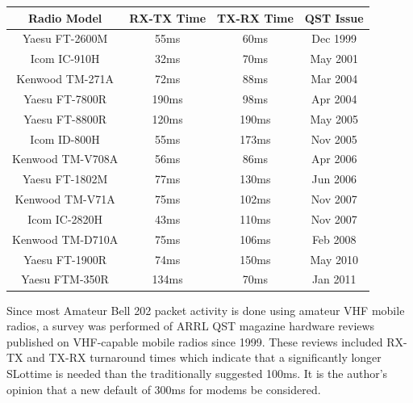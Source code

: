 \documentclass[12pt,letterpaper]{article}
\begin{document}
\begin{center}
\begin{tabular}{ | c || c | c || c |}
	\hline
	Radio Model & RX-TX Time & TX-RX Time & QST Issue \\ \hline
	Yaesu FT-2600M & 55ms & 60ms & Dec 1999 \\ \hline
	Icom IC-910H & 32ms & 70ms & May 2001 \\ \hline
	Kenwood TM-271A & 72ms & 88ms & Mar 2004 \\ \hline
	Yaesu FT-7800R & 190ms & 98ms & Apr 2004 \\ \hline
	Yaesu FT-8800R & 120ms & 190ms & May 2005 \\ \hline
	Icom ID-800H & 55ms & 173ms & Nov 2005 \\ \hline
	Kenwood TM-V708A & 56ms & 86ms & Apr 2006 \\ \hline
	Yaesu FT-1802M & 77ms & 130ms & Jun 2006 \\ \hline
	Kenwood TM-V71A & 75ms & 102ms & Nov 2007 \\ \hline
	Icom IC-2820H & 43ms & 110ms & Nov 2007 \\ \hline
	Kenwood TM-D710A & 75ms & 106ms & Feb 2008 \\ \hline
	Yaesu FT-1900R & 74ms & 150ms & May 2010 \\ \hline
	Yaesu FTM-350R & 134ms & 70ms & Jan 2011 \\ \hline

\end{tabular}
\end{center}

Since most Amateur Bell 202 packet activity is done using amateur VHF mobile radios,
a survey was performed of ARRL QST magazine hardware reviews published on VHF-capable
mobile radios since 1999.
These reviews included RX-TX and TX-RX turnaround times
which indicate that a significantly longer SLottime is needed than the 
traditionally suggested 100ms.
It is the author's opinion that a new default of 300ms for modems be considered.
\end{document}
